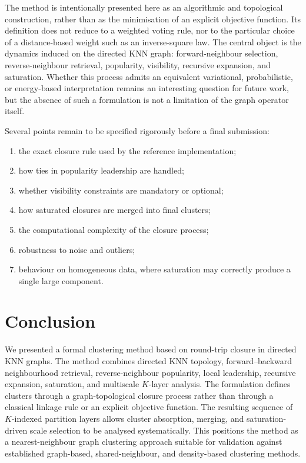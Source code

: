 \documentclass[pdflatex,sn-mathphys-num]{sn-jnl}
\begin{document}
The method is intentionally presented here as an algorithmic and topological construction, rather than as the minimisation of an explicit objective function. Its definition does not reduce to a weighted voting rule, nor to the particular choice of a distance-based weight such as an inverse-square law. The central object is the dynamics induced on the directed KNN graph: forward-neighbour selection, reverse-neighbour retrieval, popularity, visibility, recursive expansion, and saturation. Whether this process admits an equivalent variational, probabilistic, or energy-based interpretation remains an interesting question for future work, but the absence of such a formulation is not a limitation of the graph operator itself.

Several points remain to be specified rigorously before a final submission:
\begin{enumerate}
    \item the exact closure rule used by the reference implementation;
    \item how ties in popularity leadership are handled;
    \item whether visibility constraints are mandatory or optional;
    \item how saturated closures are merged into final clusters;
    \item the computational complexity of the closure process;
    \item robustness to noise and outliers;
    \item behaviour on homogeneous data, where saturation may correctly produce a single large component.
\end{enumerate}

\section{Conclusion}\label{sec:conclusion}

We presented a formal clustering method based on round-trip closure in directed KNN graphs. The method combines directed KNN topology, forward--backward neighbourhood retrieval, reverse-neighbour popularity, local leadership, recursive expansion, saturation, and multiscale $K$-layer analysis. The formulation defines clusters through a graph-topological closure process rather than through a classical linkage rule or an explicit objective function. The resulting sequence of $K$-indexed partition layers allows cluster absorption, merging, and saturation-driven scale selection to be analysed systematically. This positions the method as a nearest-neighbour graph clustering approach suitable for validation against established graph-based, shared-neighbour, and density-based clustering methods.
\end{document}
